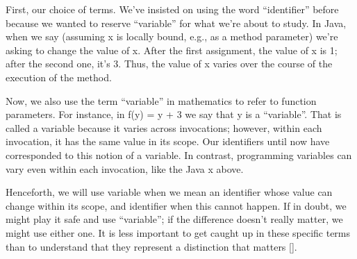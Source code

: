 
First, our choice of terms. We’ve insisted on using the word “identifier” before because
we wanted to reserve “variable” for what we’re about to study. In Java, when we say
(assuming x is locally bound, e.g., as a method parameter)
we’re asking to change the value of x. After the first assignment, the value of
x is 1; after the second one, it’s 3. Thus, the value of x varies over the
course of the execution of the method.

Now, we also use the term “variable” in mathematics to refer to function
parameters. For instance, in f(y) = y + 3 we say that y is a “variable”. That is
called a variable because it varies across invocations; however, within each
invocation, it has the same value in its scope. Our identifiers until now have
corresponded to this notion of a variable. In contrast, programming variables
can vary even within each invocation, like the Java x above.

Henceforth, we will use variable when we mean an identifier whose value can
change within its scope, and identifier when this cannot happen. If in doubt, we
might play it safe and use “variable”; if the difference doesn’t really matter,
we might use either one. It is less important to get caught up in these specific
terms than to understand that they represent a distinction that matters \ref{}.
